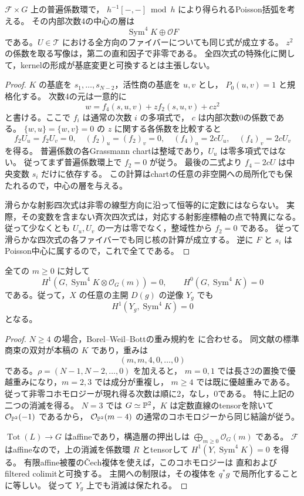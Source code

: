 \begin{lemma}
\label{lem:simultaneous-degree-two-classical-kernel}
$\mathcal F\times G$ 上の普遍係数環で，
$h^{-1}[-,-]\bmod h$ により得られるPoisson括弧を考える。
その内部次数4の中心の層は
\[
 \operatorname{Sym}^4K\oplus\mathcal O F
\]
である。$U\in\mathcal T$ における全方向のファイバーについても同じ式が成立する。
$z^2$ の係数を取る写像は，第二の直和因子で非零である。
全四次式の特殊化に関して，kernelの形成が基底変更と可換するとは主張しない。
\end{lemma}
\begin{proof}
$K$ の基底を $s_1,\ldots,s_{N-2}$，活性商の基底を $u,v$ とし，
$P_0(u,v)=1$ と規格化する。
次数4の元は一意的に
\[
 w=f_4(s,u,v)+zf_2(s,u,v)+cz^2
\]
と書ける。ここで $f_i$ は通常の次数 $i$ の多項式で，
$c$ は内部次数0の係数である。
$\{w,u\}=\{w,v\}=0$ の $z$ に関する各係数を比較すると
\[
 f_2U_u=f_2U_v=0,\quad
 (f_2)_u=(f_2)_v=0,\quad
 (f_4)_u=2cU_u,\quad (f_4)_v=2cU_v
\]
を得る。
普遍係数の各Grassmann chartは整域であり，$U_u$ は零多項式ではない。
従ってまず普遍係数環上で $f_2=0$ が従う。
最後の二式より $f_4-2cU$ は中央変数 $s_i$ だけに依存する。
この計算はchartの任意の非空開への局所化でも保たれるので，中心の層を与える。

滑らかな射影四次式は非零の線型方向に沿って恒等的に定数にはならない。
実際，その変数を含まない斉次四次式は，対応する射影座標軸の点で特異になる。
従って少なくとも $U_u,U_v$ の一方は零でなく，整域性から $f_2=0$ である。
従って滑らかな四次式の各ファイバーでも同じ核の計算が成立する。
逆に $F$ と $s_i$ はPoisson中心に属するので，これで全てである。
\end{proof}

\begin{lemma}[中心の差を貼り合わせるための消滅]
\label{lem:simultaneous-degree-two-bwb}
全ての $m\ge0$ に対して
\[
 H^1(G,\operatorname{Sym}^4K\otimes\mathcal O_G(m))=0,
 \qquad H^0(G,\operatorname{Sym}^4K)=0
\]
である。従って，$X$ の任意の主開 $D(g)$ の逆像 $Y_g$ でも
\[
 H^1(Y_g,\operatorname{Sym}^4K)=0
\]
となる。
\end{lemma}
\begin{proof}
$N\ge4$ の場合，Borel--Weil--Bottの重み規約を
\cite[Theorem~2.3]{GuoLuSharpe2017}に合わせる。
同文献の標準商束の双対が本稿の $K$ であり，重みは
\[
 (m,m,4,0,\ldots,0)
\]
である。$\rho=(N-1,N-2,\ldots,0)$ を加えると，
$m=0,1$ では長さ2の置換で優越重みになり，$m=2,3$ では成分が重複し，
$m\ge4$ では既に優越重みである。
従って非零コホモロジーが現れ得る次数は順に2，なし，0である。
特に上記の二つの消滅を得る。
$N=3$ では $G\simeq\mathbb P^2$，$K$ は定数直線のtensorを除いて
$\mathcal O_{\mathbb P^2}(-1)$ であるから，
$\mathcal O_{\mathbb P^2}(m-4)$ の通常のコホモロジーから同じ結論が従う。

$\operatorname{Tot}(L)\to G$ はaffineであり，構造層の押出しは
$\bigoplus_{m\ge0}\mathcal O_G(m)$ である。
$\mathcal F$ はaffineなので，上の消滅を係数環 $R$ とtensorして
$H^1(Y,\operatorname{Sym}^4K)=0$ を得る。
有限affine被覆の\v{C}ech複体を使えば，このコホモロジーは
直和およびfiltered colimitと可換する。
主開への制限は，その複体を $q^*g$ で局所化することに等しい。
従って $Y_g$ 上でも消滅は保たれる。
\end{proof}

